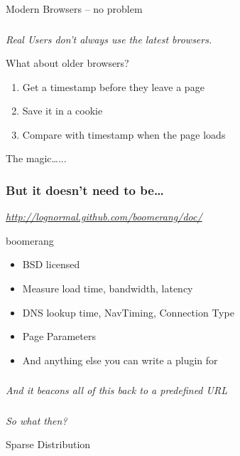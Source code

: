 \documentclass{beamer}
\newcommand{\innersplash}[1]{
  \begin{center}
    \Large \textrm{\textit{ #1 } }
  \end{center}
}
\newcommand{\splashslide}[2][{}]{
  \begin{frame}
  \frametitle{#1}
  \innersplash{#2}
  \end{frame}
}
\begin{document}
\begin{frame}{Modern Browsers -- no problem}
\end{frame}

\splashslide{Real Users don't always use the latest browsers.}

\begin{frame}{What about older browsers?}
  \begin{enumerate}
  \item Get a timestamp before they leave a page
  \item Save it in a cookie
  \item Compare with timestamp when the page loads
  \end{enumerate}
\end{frame}

\begin{frame}{The magic\ldots...}
\end{frame}

\splashslide[But it doesn't need to be\ldots]{\href{http://www.realusermeasurement.org/}{http://lognormal.github.com/boomerang/doc/}}

\begin{frame}{boomerang}
  \begin{itemize}
    \item BSD licensed
    \item Measure load time, bandwidth, latency
    \item DNS lookup time, NavTiming, Connection Type
    \item Page Parameters
    \item And anything else you can write a plugin for
  \end{itemize}
\end{frame}

\splashslide{And it beacons all of this back to a predefined URL}

\splashslide{So what then?}

\begin{frame}{Sparse Distribution}
\end{frame}
\end{document}
